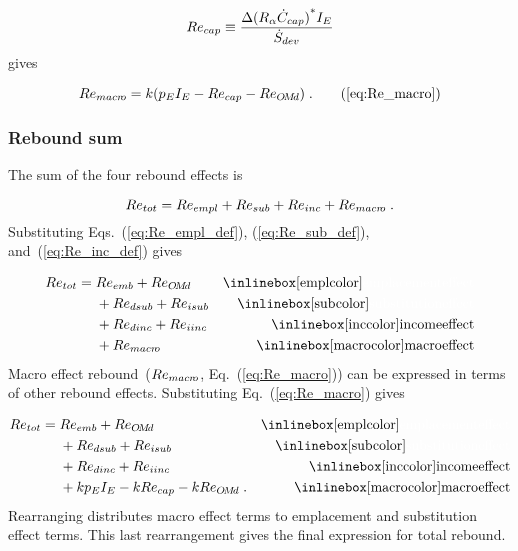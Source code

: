 \begin{equation} \label{eq:Re_cap}
  Re_{cap} \equiv \frac{\Delta {(R_\alpha \dot{C}_{cap})}^* I_E}{\dot{S}_{dev}}{}
\end{equation}
%
gives

\begin{equation}
  Re_{\macro} = \Remacroeqn{} \; . \tag{\ref{eq:Re_macro}}
\end{equation}


\subsubsection{Rebound sum} 
\label{sec:total_rebound}

The sum of the four rebound effects is 

\begin{equation}
  Re_{tot} = Re_{empl} + Re_{sub} + Re_{inc} + Re_{macr\!o} \; .
\end{equation}
%
Substituting Eqs.~(\ref{eq:Re_empl_def}), (\ref{eq:Re_sub_def}), and~(\ref{eq:Re_inc_def}) gives

\begin{align}
  Re_{tot} = \; &Re_{emb} + Re_{\omd}      & \mathrm{\empleffect} \nonumber \\
                &+ Re_{dsub} + Re_{isub}   & \mathrm{\subeffect}  \nonumber \\
                &+ Re_{dinc} + Re_{iinc}   & \mathrm{\inceffect}  \nonumber \\
                &+ Re_{\macro}      & \mathrm{\macroeffect}
\end{align}
%
Macro effect rebound~($Re_{macr\!o}$, Eq.~(\ref{eq:Re_macro}))
can be expressed in terms of other rebound effects.
Substituting Eq.~(\ref{eq:Re_macro}) gives

\begin{align}
  Re_{tot} = \; &Re_{emb} + Re_{\omd}      & \mathrm{\empleffect}       \nonumber \\
                &+ Re_{dsub} + Re_{isub}   & \mathrm{\subeffect}        \nonumber \\
                &+ Re_{dinc} + Re_{iinc}   & \mathrm{\inceffect}        \nonumber \\
                &+ k p_E I_E - k Re_{cap} - k Re_{\omd} \; .  & \mathrm{\macroeffect}
\end{align}
%
Rearranging distributes macro effect terms 
to emplacement and substitution effect terms.
This last rearrangement gives the final expression for total rebound.

